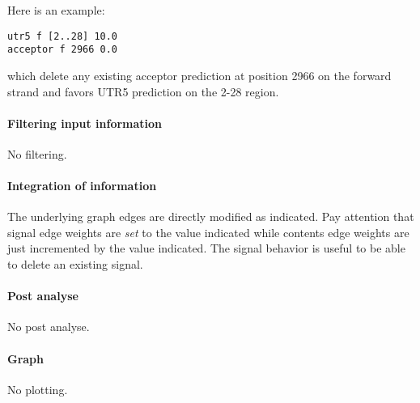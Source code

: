 Here is an example:
\begin{Verbatim}[fontsize=\small]
utr5 f [2..28] 10.0
acceptor f 2966 0.0
\end{Verbatim}

which delete any existing acceptor prediction at position 2966 on the
forward strand and favors UTR5 prediction on the 2-28 region.

\paragraph{Filtering input information}

No filtering.

\paragraph{Integration of information}

The underlying graph edges are directly modified as indicated. Pay
attention that signal edge weights are \emph{set} to the value
indicated while contents edge weights are just incremented by the
value indicated. The signal behavior is useful to be able to delete an
existing signal.

\paragraph{Post analyse}

No post analyse.

\paragraph{Graph}

No plotting.




